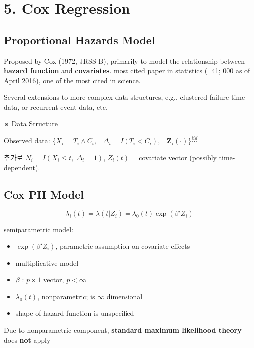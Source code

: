 \documentclass[
]{book}
\providecommand{\tightlist}{%
  \setlength{\itemsep}{0pt}\setlength{\parskip}{0pt}}
\theoremstyle{definition}
\theoremstyle{definition}
\theoremstyle{definition}
\theoremstyle{definition}
\theoremstyle{remark}
\begin{document}
\hypertarget{cox-regression}{%
\chapter{5. Cox Regression}\label{cox-regression}}

\hypertarget{proportional-hazards-model}{%
\section{Proportional Hazards Model}\label{proportional-hazards-model}}

Proposed by Cox (1972, JRSS-B), primarily to model the relationship between \textbf{hazard function} and \textbf{covariates}. most cited paper in statistics ( 41; 000 as of April 2016), one of the most cited in science.

Several extensions to more complex data structures, e.g., clustered failure time data, or recurrent event data, etc.

※ Data Structure

Observed data: \(\Big \{ X_i = T_i \wedge C_i, \; \; \; \Delta_i = I(T_i < C_i), \; \;\; \mathbf Z_i (\cdot) \Big \} \overset {iid} \sim\)

추가로 \(N_i = I(X_i \le t , \; \Delta_i = 1)\), \(Z_i(t)\) = covariate vector (possibly time-dependent).

\hypertarget{cox-ph-model}{%
\section{Cox PH Model}\label{cox-ph-model}}

\[
\lambda_i (t) = \lambda (t \vert Z_i ) = \lambda_0 (t) \exp (\beta' Z_i) \tag{Cox Model}
\]

semiparametric model:

\begin{itemize}
\tightlist
\item
  \(\exp(\beta ' Z_i)\), parametric assumption on covariate effects
\item
  multiplicative model
\item
  \(\beta\) : \(p \times 1\) vector, \(p < \infty\)
\item
  \(\lambda_0(t)\), nonparametric; is \(\infty\) dimensional
\item
  shape of hazard function is unspecified
\end{itemize}

Due to nonparametric component, \textbf{standard maximum likelihood theory} does \textbf{not} apply
\end{document}
